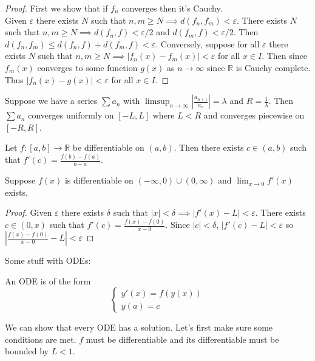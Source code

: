 \documentclass{article}
\newcommand{\R}{\mathbb{R}}
\newcommand{\eps}{\varepsilon}
\newcommand{\ra}[1][]{\xrightarrow{#1}}
\begin{document}
\begin{proof}
  First we show that if $f_n$ converges then it's Cauchy.\\
  Given $\eps$ there exists $N$ such that $n,m\geq N\implies d(f_n,f_m)<\eps$. There exists $N$ such that $n,m\geq N\implies d(f_n,f)<\eps/2$ and $d(f_m,f)<\eps/2$. Then $d(f_n,f_m)\leq d(f_n,f)+d(f_m,f)<\eps$. Conversely, suppose for all $\eps$ there exists $N$ such that $n,m\geq N\implies |f_n(x)-f_m(x)|<\eps$ for all $x\in I$. Then since $f_m(x)$ converges to some function $g(x)$ as $n\ra\infty$ since $\R$ is Cauchy complete. Thus $|f_n(x)-g(x)|<\eps$ for all $x\in I$.
\end{proof}
\begin{theorem}
  Suppose we have a series $\sum a_n$ with $\limsup_{n\to\infty}|\frac{a_{n+1}}{a_n}|=\lambda$ and $R=\frac{1}{\lambda}$. Then $\sum a_n$ converges uniformly on $[-L,L]$ where $L<R$ and converges piecewise on $[-R,R]$.
\end{theorem}
\begin{theorem}
  Let $f:[a,b]\ra \R$ be differentiable on $(a,b)$. Then there exists $c\in(a,b)$ such that $f'(c)=\frac{f(b)-f(a)}{b-a}$.
\end{theorem}
\begin{problem}
  Suppose $f(x)$ is differentiable on $(-\infty,0)\cup(0,\infty)$ and $\lim_{x\to 0}f'(x)$ exists.
\end{problem}
\begin{proof}
  Given $\eps$ there exists $\delta$ such that $|x|<\delta\implies |f'(x)-L|<\eps$. There exists $c\in(0,x)$ such that $f'(c)=\frac{f(x)-f(0)}{x-0}$. Since $|c|<\delta$, $|f'(c)-L|<\eps$ so $|\frac{f(x)-f(0)}{x-0}-L|<\eps$
\end{proof}
Some stuff with ODEs:
\begin{definition}
  An ODE is of the form
  \begin{equation*}
    \begin{cases}
      y'(x)=f(y(x)) \\
      y(a)=c
    \end{cases}
  \end{equation*}
\end{definition}
We can show that every ODE has a solution. Let's first make sure some conditions are met. $f$ must be differentiable and its differentiable must be bounded by $L<1$.
\end{document}
